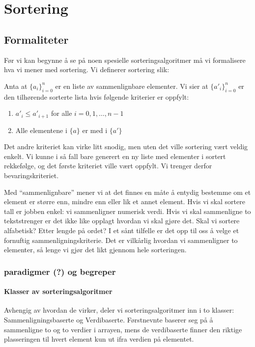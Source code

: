 \section{\color{red}Sortering}
\subsection{Formaliteter}
\label{sort_form}
Før vi kan begynne å se på noen spesielle sorteringsalgoritmer må vi formalisere hva vi mener med sortering. Vi definerer sortering slik:

\begin{definisjon}
Anta at $ {\{a_i\}}_{i=0}^n $ er en liste av sammenlignbare elementer. Vi sier at $ {\{a'_i\}}_{i=0}^n $ er den tilhørende sorterte lista hvis følgende kriterier er oppfylt:
\begin{enumerate}[i]
\item $ a'_i \leq a'_{i+1} $ for alle $ i = 0, 1, \ldots, n-1 $
\item Alle elementene i $ \{a\} $ er med i $ \{a'\} $
\end{enumerate}
\end{definisjon}

Det andre kriteriet kan virke litt snodig, men uten det ville sortering vært veldig enkelt. Vi kunne i så fall bare generert en ny liste med elementer i sortert rekkefølge, og det første kriteriet ville vært oppfylt. Vi trenger derfor bevaringskriteriet. 

Med ``sammenlignbare'' mener vi at det finnes en måte å entydig bestemme om et element er større enn, mindre enn eller lik et annet element. Hvis vi skal sortere tall er jobben enkel: vi sammenligner numerisk verdi. Hvis vi skal sammenligne to tekststrenger er det ikke like opplagt hvordan vi skal gjøre det. Skal vi sortere alfabetisk? Etter lengde på ordet? I et sånt tilfelle er det opp til oss å velge et fornuftig sammenligningskriterie. Det er vilkårlig hvordan vi sammenligner to elementer, så lenge vi gjør det likt gjennom hele sorteringen. 

\subsubsection{\color{red}paradigmer (?) og begreper}
\label{sec:sortbegrep}

\paragraph{Klasser av sorteringsalgoritmer}
Avhengig av hvordan de virker, deler vi sorteringsalgoritmer inn i to klasser:
Sammenligningsbaserte og Verdibaserte. Førstnevnte baserer seg på å sammenligne
to og to verdier i arrayen, mens de verdibaserte finner den riktige plasseringen
til hvert element kun ut ifra verdien på elementet. 


